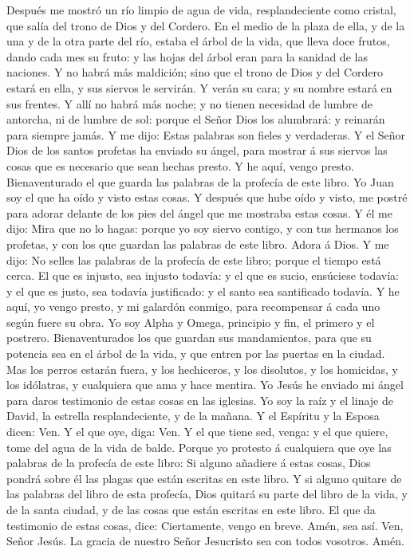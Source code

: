  Después me mostró un río limpio de agua de vida,
resplandeciente como cristal, que salía del trono de Dios y del Cordero.
 En el medio de la plaza de ella, y de la una y de la otra
parte del río, estaba el árbol de la vida, que lleva doce frutos, dando
cada mes su fruto: y las hojas del árbol eran para la sanidad de las
naciones.  Y no habrá más maldición; sino que el trono de
Dios y del Cordero estará en ella, y sus siervos le servirán.
 Y verán su cara; y su nombre estará en sus frentes.
 Y allí no habrá más noche; y no tienen necesidad de lumbre
de antorcha, ni de lumbre de sol: porque el Señor Dios los alumbrará: y
reinarán para siempre jamás.  Y me dijo: Estas palabras son
fieles y verdaderas. Y el Señor Dios de los santos profetas ha enviado
su ángel, para mostrar á sus siervos las cosas que es necesario que sean
hechas presto.  Y he aquí, vengo presto. Bienaventurado el
que guarda las palabras de la profecía de este libro.  Yo
Juan soy el que ha oído y visto estas cosas. Y después que hube oído y
visto, me postré para adorar delante de los pies del ángel que me
mostraba estas cosas.  Y él me dijo: Mira que no lo hagas:
porque yo soy siervo contigo, y con tus hermanos los profetas, y con los
que guardan las palabras de este libro. Adora á Dios.  Y me
dijo: No selles las palabras de la profecía de este libro; porque el
tiempo está cerca.  El que es injusto, sea injusto todavía:
y el que es sucio, ensúciese todavía: y el que es justo, sea todavía
justificado: y el santo sea santificado todavía.  Y he
aquí, yo vengo presto, y mi galardón conmigo, para recompensar á cada
uno según fuere su obra.  Yo soy Alpha y Omega, principio y
fin, el primero y el postrero.  Bienaventurados los que
guardan sus mandamientos, para que su potencia sea en el árbol de la
vida, y que entren por las puertas en la ciudad.  Mas los
perros estarán fuera, y los hechiceros, y los disolutos, y los
homicidas, y los idólatras, y cualquiera que ama y hace mentira.
 Yo Jesús he enviado mi ángel para daros testimonio de
estas cosas en las iglesias. Yo soy la raíz y el linaje de David, la
estrella resplandeciente, y de la mañana.  Y el Espíritu y
la Esposa dicen: Ven. Y el que oye, diga: Ven. Y el que tiene sed,
venga: y el que quiere, tome del agua de la vida de balde. 
Porque yo protesto á cualquiera que oye las palabras de la profecía de
este libro: Si alguno añadiere á estas cosas, Dios pondrá sobre él las
plagas que están escritas en este libro.  Y si alguno
quitare de las palabras del libro de esta profecía, Dios quitará su
parte del libro de la vida, y de la santa ciudad, y de las cosas que
están escritas en este libro.  El que da testimonio de
estas cosas, dice: Ciertamente, vengo en breve. Amén, sea así. Ven,
Señor Jesús.  La gracia de nuestro Señor Jesucristo sea con
todos vosotros. Amén.

